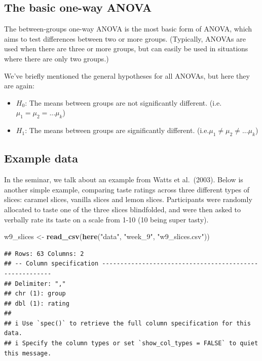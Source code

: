 \documentclass[
]{book}
\newenvironment{Shaded}{\begin{snugshade}}{\end{snugshade}}
\newcommand{\FunctionTok}[1]{\textcolor[rgb]{0.13,0.29,0.53}{\textbf{#1}}}
\newcommand{\NormalTok}[1]{#1}
\newcommand{\OtherTok}[1]{\textcolor[rgb]{0.56,0.35,0.01}{#1}}
\newcommand{\StringTok}[1]{\textcolor[rgb]{0.31,0.60,0.02}{#1}}
\providecommand{\tightlist}{%
  \setlength{\itemsep}{0pt}\setlength{\parskip}{0pt}}
\begin{document}
\hypertarget{the-basic-one-way-anova}{%
\subsection{The basic one-way ANOVA}\label{the-basic-one-way-anova}}

The between-groups one-way ANOVA is the most basic form of ANOVA, which
aims to test differences between two or more groups. (Typically, ANOVAs
are used when there are three or more groups, but can easily be used in
situations where there are only two groups.)

We've briefly mentioned the general hypotheses for all ANOVAs, but here
they are again:

\begin{itemize}
\tightlist
\item
  \(H_0\): The means between groups are not significantly different.
  (i.e.~\(\mu_1 = \mu_2 = ... \mu_k\))
\item
  \(H_1\): The means between groups are significantly different.
  (i.e.\(\mu_1 \neq \mu_2 \neq ... \mu_k\))
\end{itemize}

\hypertarget{example-data-3}{%
\subsection{Example data}\label{example-data-3}}

In the seminar, we talk about an example from Watts et al.~(2003). Below
is another simple example, comparing taste ratings across three
different types of slices: caramel slices, vanilla slices and lemon
slices. Participants were randomly allocated to taste one of the three
slices blindfolded, and were then asked to verbally rate its taste on a
scale from 1-10 (10 being super tasty).

\begin{Shaded}
\begin{Highlighting}[]
\NormalTok{w9\_slices }\OtherTok{\textless{}{-}} \FunctionTok{read\_csv}\NormalTok{(}\FunctionTok{here}\NormalTok{(}\StringTok{"data"}\NormalTok{, }\StringTok{"week\_9"}\NormalTok{, }\StringTok{"w9\_slices.csv"}\NormalTok{))}
\end{Highlighting}
\end{Shaded}

\begin{verbatim}
## Rows: 63 Columns: 2
## -- Column specification --------------------------------------------------------
## Delimiter: ","
## chr (1): group
## dbl (1): rating
## 
## i Use `spec()` to retrieve the full column specification for this data.
## i Specify the column types or set `show_col_types = FALSE` to quiet this message.
\end{verbatim}
\end{document}
